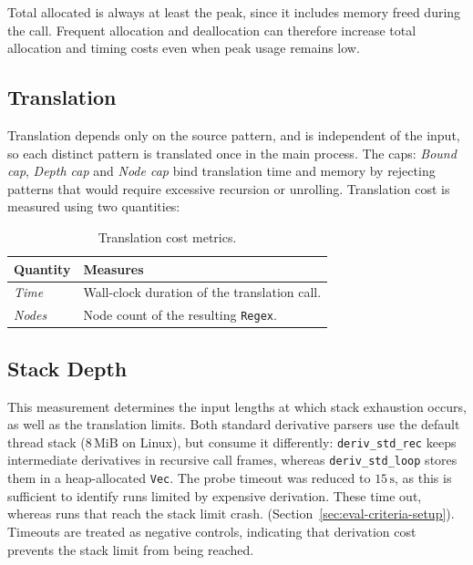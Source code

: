 Total allocated is always at least the peak, 
since it includes memory freed during the call. 
Frequent allocation and deallocation can therefore increase total allocation 
and timing costs even when peak usage remains low. 

%
%
%

\subsection{Translation}
\label{sec:eval-criteria-translation}

Translation depends only on the source pattern, 
and is independent of the input,
so each distinct pattern is translated once in the main process. 
The caps: \emph{Bound cap}, \emph{Depth cap} and \emph{Node cap} 
bind translation time and memory by rejecting patterns 
that would require excessive recursion or unrolling. 
Translation cost is measured using two quantities:
\begin{table}[ht]
\centering
\small
\renewcommand{\arraystretch}{1.15}
\begin{tabularx}{\textwidth}{@{}l >{\raggedright\arraybackslash}X@{}}
\textbf{Quantity} & \textbf{Measures} \\
\hline
\emph{Time} & Wall-clock duration of the translation call. \\
\emph{Nodes} & Node count of the resulting \texttt{Regex}. \\
\end{tabularx}
\caption{Translation cost metrics.}
\label{tab:eval-translation-metrics}
\end{table}

%
%
%

\subsection{Stack Depth}
\label{sec:eval-criteria-stack-depth}

This measurement determines the input lengths
at which stack exhaustion occurs, as well as
the translation limits.
Both standard derivative parsers use the default
thread stack ($8\,\mathrm{MiB}$ on Linux),
but consume it differently:
\texttt{deriv\_std\_rec} keeps intermediate
derivatives in recursive call frames, whereas
\texttt{deriv\_std\_loop} stores them in a
heap-allocated \texttt{Vec}.
The probe timeout was reduced to $15\,\mathrm{s}$,
as this is sufficient to identify runs limited by expensive derivation.
These time out, whereas runs that reach the stack limit crash.
(Section~\ref{sec:eval-criteria-setup}).
Timeouts are treated as negative controls,
indicating that derivation cost prevents
the stack limit from being reached.

